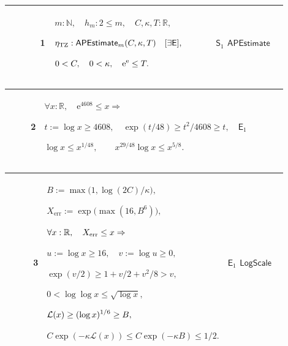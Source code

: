 \documentclass[12pt,reqno]{amsart}
\theoremstyle{blueplain}
\numberwithin{equation}{section}
\begin{document}
\label{sec:analytic-corollary} {\scriptsize \setlength{\parskip}{0pt}%
\noindent 
\begin{tabular}{|@{}>{\centering\arraybackslash}m{0.10658\linewidth}|>{\centering\arraybackslash}m{0.03553\linewidth}|>{\centering\arraybackslash}m{0.52105\linewidth}|>{\centering\arraybackslash}m{0.23684\linewidth}|}
\hline
{\hypertarget{row:E1}{$\mathsf{E}$}} & {1} & {$\displaystyle m:\mathbb{N}%
,\quad h_m:2\le m,\quad C,\kappa,T:\mathbb{R},$ \par$\displaystyle \eta_{%
\mathrm{TZ}}:\hyperlink{def:APEstimate}{\mathsf{APEstimate} }_m(C,\kappa,T)%
\quad[\exists\mathsf{E}],$ \par$\displaystyle 0<C,\quad0<\kappa,\quad\mathrm{%
e}^{\mathrm{e}}\le T.$} & {\hyperlink{row:S1}{$\mathsf{S}_{1}$} \hyperlink{def:APEstimate}%
{$\mathsf{APEstimate}$}} \\ \hline
\end{tabular}
}

{\scriptsize \setlength{\parskip}{0pt}\nointerlineskip
\noindent 
\begin{tabular}{|@{}>{\centering\arraybackslash}m{0.10658\linewidth}|>{\centering\arraybackslash}m{0.03553\linewidth}|>{\centering\arraybackslash}m{0.52105\linewidth}|>{\centering\arraybackslash}m{0.23684\linewidth}|}
\hline
{\hypertarget{row:E2}{$\mathsf{E}$}} & {2} & {$\displaystyle \forall x:%
\mathbb{R},\quad\mathrm{e}^{4608}\le x\Rightarrow$ \par$\displaystyle %
t:=\log x\ge4608,\quad\exp(t/48)\ge t^2/4608\ge t,$ \par$\displaystyle \log
x\le x^{1/48},\qquad x^{29/48}\log x\le x^{5/8}.$} & {\hyperlink{row:E1}{$%
\mathsf{E}_{1}$}} \\ \hline
\end{tabular}
}

{\scriptsize \setlength{\parskip}{0pt}\nointerlineskip
\noindent 
\begin{tabular}{|@{}>{\centering\arraybackslash}m{0.10658\linewidth}|>{\centering\arraybackslash}m{0.03553\linewidth}|>{\centering\arraybackslash}m{0.52105\linewidth}|>{\centering\arraybackslash}m{0.23684\linewidth}|}
\hline
{\hypertarget{row:E3}{$\mathsf{E}$}} & {3} & {$\displaystyle B:=\max\bigl(%
1,\log(2C)/\kappa\bigr),$ \par$\displaystyle X_{\mathrm{err}}:=\exp\bigl(%
\max(16,B^6)\bigr),$ \par$\displaystyle \forall x:\mathbb{R},\quad X_{%
\mathrm{err}}\le x\Rightarrow$ \par$\displaystyle u:=\log x\ge16,\quad
v:=\log u\ge0,$ \par$\displaystyle \exp(v/2)\ge1+v/2+v^2/8>v,$ \par$%
\displaystyle 0<\log\log x\le\sqrt{\log x},$ \par$\displaystyle \hyperlink{def:LogScale}%
{\mathcal{L}(x)}\ge(\log x)^{1/6}\ge B,$ \par$\displaystyle C\exp(-\kappa%
\mathcal{L}(x))\le C\exp(-\kappa B)\le1/2.$} & {\hyperlink{row:E1}{$\mathsf{E%
}_{1}$} \hyperlink{def:LogScale}{$\mathsf{LogScale}$}} \\ \hline
\end{tabular}
}
\end{document}
